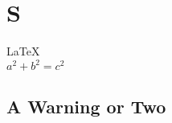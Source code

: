 \documentclass{article}
\begin{document}
               
 
 
\section{S}          
\LaTeX \,\\ 
 $a^2+b^2=c^2$

\subsection{A Warning or Two}  

\end{document}
